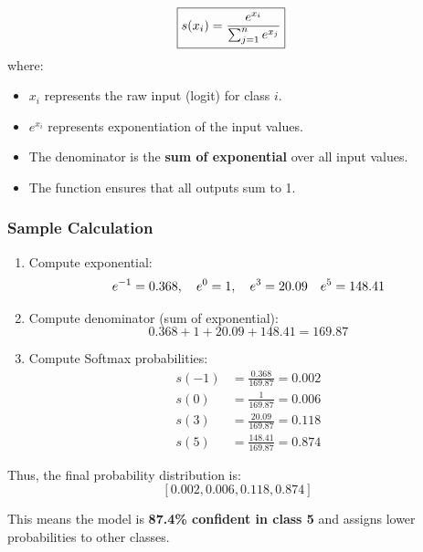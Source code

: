 \documentclass{article}
\begin{document}
\begin{align*}
  \Aboxed{s(x_i) = \frac{e^{x_i}}{\sum_{j=1}^{n} e^{x_j}}}
\end{align*}
where:
\begin{itemize}
    \item \( x_i \) represents the raw input (logit) for class \( i \).
    \item \( e^{x_i} \) represents exponentiation of the input values.
    \item The denominator is the \textbf{sum of exponential} over all input values.
    \item The function ensures that all outputs sum to 1.
\end{itemize}
\subsubsection{Sample Calculation} 
\begin{enumerate}
    \item Compute exponential:
    \[
    e^{-1} = 0.368, \quad e^0 = 1, \quad e^3 = 20.09 \\
    \quad e^5 = 148.41
    \]

    \item Compute denominator (sum of exponential):
    \[
    0.368 + 1 + 20.09 + 148.41 = 169.87
    \]

    \item Compute Softmax probabilities:
    \begin{align*}
      s(-1) &= \frac{0.368}{169.87} = 0.002\\ 
      s(0) &= \frac{1}{169.87} = 0.006\\ 
      s(3) &= \frac{20.09}{169.87} = 0.118\\ 
      s(5) &= \frac{148.41}{169.87} = 0.874
    \end{align*}
\end{enumerate}

Thus, the final probability distribution is:
\[
[0.002, 0.006, 0.118, 0.874]
\]

This means the model is \textbf{87.4\% confident in class 5} and assigns lower probabilities to other classes.
\end{document}
